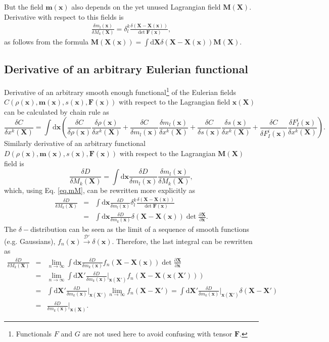 \documentclass[
10pt, %
a4paper, %
oneside, %
headinclude,footinclude, %
BCOR5mm, %
]{scrartcl}
\newcommand{\xx}{\mathbf{x}}
\newcommand{\XX}{\mathbf{X}}
\newcommand{\dX}{\mathrm{d}\XX}
\newcommand{\dx}{\mathrm{d}\xx}
\newcommand{\mm}{\mathbf{m}}
\newcommand{\MM}{\mathbf{M}}
\newcommand{\FF}{\mathbf{F}}
\begin{document}
But the field $\mm(\xx)$ also depends on the yet unused Lagrangian field $\MM(\XX)$. Derivative with respect to this fields is
\begin{eqnarray}\label{eq.mM}
	\frac{\delta m_l(\xx)}{\delta M_k(\XX)} = \delta^k_l \frac{\delta(\XX-\XX(\xx))}{\det\FF(\xx)},
\end{eqnarray}
as follows from the formula $\MM(\XX(\xx)) = \int\dX \delta(\XX-\XX(\xx)) \MM(\XX)$.

\subsection{Derivative of an arbitrary Eulerian functional}
Derivative of an arbitrary smooth enough functional\footnote{Functionals $F$ and $G$ are not used here to avoid confusing with tensor $\FF$.} of the Eulerian fields $C(\rho(\xx), \mm(\xx), s(\xx), \FF(\xx))$ with respect to the Lagrangian field $\xx(\XX)$ can be calculated by chain rule as
\begin{equation}\label{eq.Cx}
	\frac{\delta C}{\delta x^k(\XX)} = \int\dx \left(\frac{\delta C}{\delta \rho(\xx)}\frac{\delta \rho(\xx)}{\delta x^k(\XX)}
	+\frac{\delta C}{\delta m_l(\xx)}\frac{\delta m_l(\xx)}{\delta x^k(\XX)}
	+\frac{\delta C}{\delta s(\xx)}\frac{\delta s(\xx)}{\delta x^k(\XX)}
	+\frac{\delta C}{\delta F^i_I(\xx)}\frac{\delta F^i_I(\xx)}{\delta x^k(\XX)}\right).
\end{equation}
Similarly derivative of an arbitrary functional $D(\rho(\xx), \mm(\xx), s(\xx), \FF(\xx))$ with respect to the Lagrangian $\MM(\XX)$ field is
\begin{equation}
	\frac{\delta D}{\delta M_k(\XX)} = \int\dx \frac{\delta D}{\delta m_l(\xx)}\frac{\delta m_l(\xx)}{\delta M_k(\XX)},
\end{equation}
which, using Eq. \eqref{eq.mM}, can be rewritten more explicitly as
\begin{eqnarray}
	\frac{\delta D}{\delta M_k(\XX)} &=& \int\dx \frac{\delta D}{\delta m_l(\xx)}\delta^k_l \frac{\delta(\XX-\XX(\xx))}{\det\FF(\xx)}\nonumber\\
	&=& \int\dx \frac{\delta D}{\delta m_k(\xx)}\delta(\XX-\XX(\xx))\det\frac{\partial \XX}{\partial \xx}.
\end{eqnarray}
The $\delta-$distribution can be seen as the limit of a sequence of smooth functions (e.g. Gaussians), $f_n(\xx)\stackrel{\mathcal{D}'}{\to}\delta(\xx)$. Therefore, the last integral can be rewritten as
\begin{eqnarray}
	\frac{\delta D}{\delta M_k(\XX)} &=& \lim_{n\to\infty}\int\dx \frac{\delta D}{\delta m_k(\xx)}f_n(\XX-\XX(\xx)) \det\frac{\partial \XX}{\partial \xx}\nonumber\\
	&=& \lim_{n\to\infty}\int\dX' \frac{\delta D}{\delta m_k(\xx)}\Big|_{\xx(\XX')} f_n(\XX-\XX(\xx(\XX'))) \nonumber\\
	&=& \int\dX' \frac{\delta D}{\delta m_k(\xx)}\Big|_{\xx(\XX')} \lim_{n\to\infty}f_n(\XX-\XX') 
	= \int\dX' \frac{\delta D}{\delta m_k(\xx)}\Big|_{\xx(\XX')} \delta(\XX-\XX') \nonumber\\
	&=&\frac{\delta D}{\delta m_k(\xx)}\Big|_{\xx(\XX)}.
\end{eqnarray}
\end{document}
